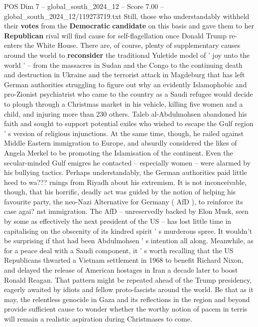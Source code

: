 \begin{textsample}{POS Dim 7 – global\_south\_2024\_12 – Score 7.00 – global\_south\_2024\_12/119273719.txt}
Still, those who understandably withheld their \textbf{votes} from the \textbf{Democratic} \textbf{candidate} on this basis and gave them to her \textbf{Republican} rival will find cause for self-flagellation once Donald Trump re-enters the White House.
There are, of course, plenty of supplementary causes around the world to \textbf{reconsider} the traditional Yuletide model of ' joy unto the world ' -- from the massacres in Sudan and the Congo to the continuing death and destruction in Ukraine and the terrorist attack in Magdeburg that has left German authorities struggling to figure out why an evidently Islamophobic and pro-Zionist psychiatrist who came to the country as a Saudi refugee would decide to plough through a Christmas market in his vehicle, killing five women and a child, and injuring more than 230 others.
Taleb al-Abdulmohsen abandoned his faith and sought to support potential exiles who wished to escape the Gulf region ' s version of religious injunctions.
At the same time, though, he railed against Middle Eastern immigration to Europe, and absurdly considered the likes of Angela Merkel to be promoting the Islamisation of the continent.
Even the secular-minded Gulf emigres he contacted -- especially women -- were alarmed by his bullying tactics.
Perhaps understandably, the German authorities paid little heed to wa??? rnings from Riyadh about his extremism.
It is not inconceivable, though, that his horrific, deadly act was guided by the notion of helping his favourite party, the neo-Nazi Alternative for Germany ( AfD ), to reinforce its case agai? nst immigration.
The AfD -- unreservedly backed by Elon Musk, seen by some as effectively the next president of the US -- has lost little time in capitalising on the obscenity of its kindred spirit ' s murderous spree.
It wouldn't be surprising if that had been Abdulmohsen ' s intention all along.
Meanwhile, as for a peace deal with a Saudi component, it ' s worth recalling that the US Republicans thwarted a Vietnam settlement in 1968 to benefit Richard Nixon, and delayed the release of American hostages in Iran a decade later to boost Ronald Reagan.
That pattern might be repeated ahead of the Trump presidency, eagerly awaited by idiots and fellow proto-fascists around the world.
Be that as it may, the relentless genocide in Gaza and its reflections in the region and beyond provide sufficient cause to wonder whether the worthy notion of pacem in terris will remain a realistic aspiration during Christmases to come.

\end{textsample}
